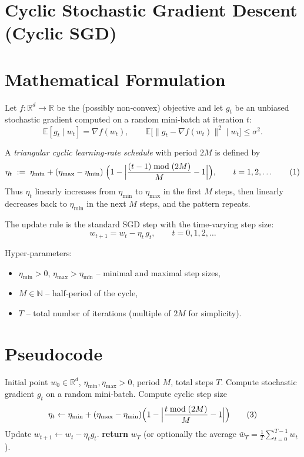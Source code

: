 \documentclass{article}
\begin{document}
\section*{Cyclic Stochastic Gradient Descent (Cyclic SGD)}

\section*{Mathematical Formulation}
Let $f:\mathbb{R}^d\rightarrow\mathbb{R}$ be the (possibly non‑convex) objective and let 
$g_t$ be an unbiased stochastic gradient computed on a random mini‑batch at iteration $t$:
\[
\mathbb{E}[g_t\mid w_t]=\nabla f(w_t),\qquad 
\mathbb{E}\big[\|g_t-\nabla f(w_t)\|^2\mid w_t\big]\le\sigma^2 .
\]

A \emph{triangular cyclic learning‑rate schedule} with period $2M$ is defined by
\[
\eta_t \;:=\; \eta_{\min}+(\eta_{\max}-\eta_{\min})\;
\Bigl(1-\Bigl|\frac{(t-1)\bmod (2M)}{M}-1\Bigr|\Bigr),\qquad t=1,2,\dots
\tag{1}
\]
Thus $\eta_t$ linearly increases from $\eta_{\min}$ to $\eta_{\max}$ in the first $M$ steps,
then linearly decreases back to $\eta_{\min}$ in the next $M$ steps, and the pattern repeats.

The update rule is the standard SGD step with the time‑varying step size:
\[
w_{t+1}=w_t-\eta_t\,g_t,\qquad t=0,1,2,\dots
\tag{2}
\]

Hyper‑parameters:
\begin{itemize}
    \item $\eta_{\min}>0$, $\eta_{\max}> \eta_{\min}$ – minimal and maximal step sizes,
    \item $M\in\mathbb{N}$ – half‑period of the cycle,
    \item $T$ – total number of iterations (multiple of $2M$ for simplicity).
\end{itemize}

\section*{Pseudocode}
\begin{algorithm}[H]
\caption{Cyclic SGD}
\begin{algorithmic}[1]
\Require Initial point $w_0\in\mathbb{R}^d$, 
        $\eta_{\min},\eta_{\max}>0$, period $M$, total steps $T$.
    \State Compute stochastic gradient $g_t$ on a random mini‑batch.
    \State Compute cyclic step size
    \[
    \eta_t \gets \eta_{\min}+(\eta_{\max}-\eta_{\min})
    \Bigl(1-\Bigl|\frac{t\bmod (2M)}{M}-1\Bigr|\Bigr)
    \tag{3}
    \]
    \State Update $w_{t+1}\gets w_t-\eta_t g_t$.
\EndFor
\State \textbf{return} $w_T$ (or optionally the average $\bar w_T=\frac1T\sum_{t=0}^{T-1}w_t$).
\end{algorithmic}
\end{algorithm}
\end{document}
